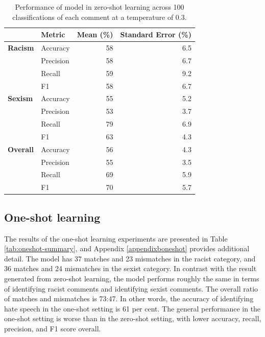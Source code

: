 \documentclass[12pt,]{article}
\begin{document}
\begin{table}

\caption{\label{tab:zeroshot-summary}Performance of model in zero-shot learning across 100 classifications of each comment at a temperature of 0.3.}
\centering
\begin{tabular}[t]{>{}llrr}
\toprule
 & Metric & Mean (\%) & Standard Error (\%)\\
\midrule
\textbf{Racism} & Accuracy & 58 & 6.5\\
\textbf{} & Precision & 58 & 6.7\\
\textbf{} & Recall & 59 & 9.2\\
\textbf{} & F1 & 58 & 6.7\\
\textbf{Sexism} & Accuracy & 55 & 5.2\\
\textbf{} & Precision & 53 & 3.7\\
\textbf{} & Recall & 79 & 6.9\\
\textbf{} & F1 & 63 & 4.3\\
\textbf{Overall} & Accuracy & 56 & 4.3\\
\textbf{} & Precision & 55 & 3.5\\
\textbf{} & Recall & 69 & 5.9\\
\textbf{} & F1 & 70 & 5.7\\
\bottomrule
\end{tabular}
\end{table}

\hypertarget{one-shot-learning-1}{%
\subsection{One-shot learning}\label{one-shot-learning-1}}

The results of the one-shot learning experiments are presented in Table \ref{tab:oneshot-summary}, and Appendix \ref{appendixboneshot} provides additional detail. The model has 37 matches and 23 mismatches in the racist category, and 36 matches and 24 mismatches in the sexist category. In contrast with the result generated from zero-shot learning, the model performs roughly the same in terms of identifying racist comments and identifying sexist comments. The overall ratio of matches and mismatches is 73:47. In other words, the accuracy of identifying hate speech in the one-shot setting is 61 per cent. The general performance in the one-shot setting is worse than in the zero-shot setting, with lower accuracy, recall, precision, and F1 score overall.
\end{document}
